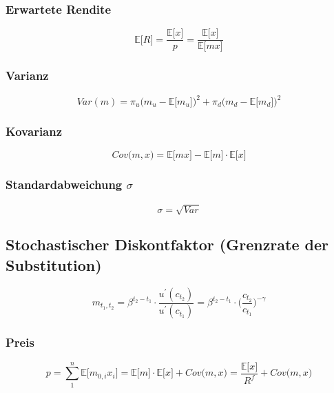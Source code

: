\subsubsection{Erwartete Rendite}
\begin{equation}
	\mathbb{E} \big\lbrack R \big\rbrack = \frac{\mathbb{E} \big\lbrack x \big\rbrack}{p} = \frac{\mathbb{E} \big\lbrack x \big\rbrack}{\mathbb{E} \big\lbrack mx \big\rbrack}
\end{equation}

\subsubsection{Varianz}
\begin{equation}
	Var(m) = \pi_u \Big(m_u - \mathbb{E} \big\lbrack m_u \big\rbrack\Big)^2 + \pi_d \Big(m_d - \mathbb{E} \big\lbrack m_d \big\rbrack\Big)^2
\end{equation}

\subsubsection{Kovarianz}
\begin{equation}
	Cov\big(m,x\big) = \mathbb{E} \big\lbrack m x \big\rbrack - \mathbb{E} \big\lbrack m \big\rbrack \cdot \mathbb{E} \big\lbrack x \big\rbrack
\end{equation}

\subsubsection{Standardabweichung \(\sigma\)}
\begin{equation}
	\sigma = \sqrt{Var}
\end{equation}


\subsection{Stochastischer Diskontfaktor (Grenzrate der Substitution)}
\begin{equation}
	m_{t_1,t_2} = \beta^{t_2 - t_1} \cdot \frac{u^\prime(c_{t_2})}{u^\prime(c_{t_1})} = \beta^{t_2 - t_1} \cdot \bigg(\frac{c_{t_2}}{c_{t_1}}\bigg)^{-\gamma} \label{eq:m}
\end{equation}

\subsubsection{Preis}
\begin{equation}
	p = \sum^n_1 \mathbb{E} \big\lbrack m_{0,i} x_i \big\rbrack = \mathbb{E} \big\lbrack m \big\rbrack \cdot \mathbb{E} \big\lbrack x \big\rbrack + Cov\big(m,x\big) = \frac{\mathbb{E} \big\lbrack x \big\rbrack}{R^f} + Cov\big(m,x\big) \label{eq:p}
\end{equation}
